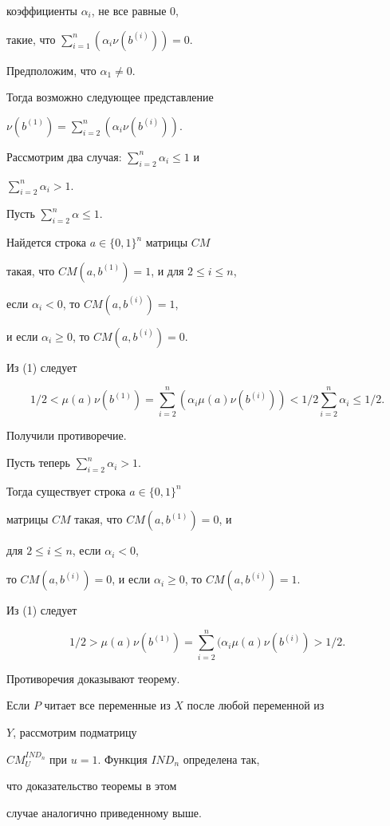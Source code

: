 \begin{pf}
коэффициенты $\alpha_i$, не все равные 0,


такие, что $\sum\limits_{i=1}^{n}(\alpha_i\nu(b^{(i)})) = 0$.


Предположим, что $\alpha_1\ne0$.


Тогда возможно следующее представление


$\nu(b^{(1)})=\sum\limits_{i=2}^n(\alpha_i\nu(b^{(i)}))$.





Рассмотрим два случая: $\sum\limits_{i=2}^n\alpha_i\le 1$ и


$\sum\limits_{i=2}^n\alpha_i>1$.





Пусть $\sum\limits_{i=2}^n\alpha\le 1$.


Найдется строка $a\in \{0,1\}^n$ матрицы $CM$


такая, что $CM(a,b^{(1)})=1$, и для $2\le i\le n$,


если $\alpha_i<0$, то $CM(a,b^{(i)})=1$,


и если $\alpha_i\geq 0$, то $CM(a,b^{(i)})=0$.


Из (1) следует


$$


1/2<\mu(a)\nu(b^{(1)})=\sum_{i=2}^{n}(\alpha_i\mu(a)\nu(b^{(i)}))


<1/2\sum_{i=2}^{n}\alpha_i\le 1/2.


$$


Получили противоречие.





Пусть теперь $\sum\limits_{i=2}^{n}\alpha_i>1$.


Тогда существует строка $a\in\{0,1\}^n$


матрицы $CM$ такая, что $CM(a,b^{(1)})=0$, и


для $2\le i\le n$, если $\alpha_i<0$,


то $CM(a,b^{(i)})=0$, и если $\alpha_i\geq 0$, то $CM(a,b^{(i)})=1$.


Из (1) следует


$$


1/2>\mu(a)\nu(b^{(1)})=\sum_{i=2}^n(\alpha_i\mu(a)\nu(b^{(i)})>1/2.


$$


Противоречия доказывают теорему.





Если $P$ читает все переменные из $X$ после любой переменной из


$Y$, рассмотрим подматрицу


$CM_U^{IND_n}$ при $u=1$. Функция $IND_n$ определена так,


что доказательство теоремы в этом


случае аналогично приведенному выше.


\end{pf}








